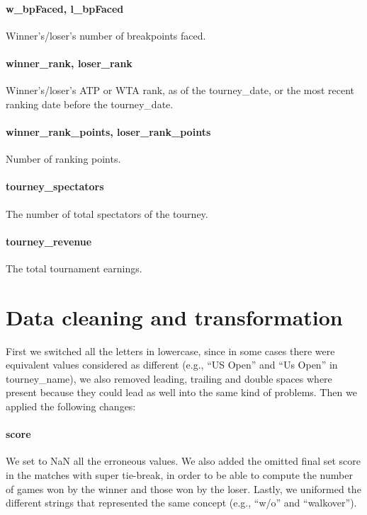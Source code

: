 \documentclass{article}
\begin{document}
\paragraph{w\_bpFaced, l\_bpFaced}
Winner's/loser's number of breakpoints faced.

\paragraph{winner\_rank, loser\_rank}
Winner's/loser's ATP or WTA rank, as of the tourney\_date, or the most recent ranking date before the tourney\_date.

\paragraph{winner\_rank\_points, loser\_rank\_points}
Number of ranking points.

\paragraph{tourney\_spectators}
The number of total spectators of the tourney.

\paragraph{tourney\_revenue}
The total tournament earnings.

\section{Data cleaning and transformation}

First we switched all the letters in lowercase, since in some cases there were equivalent values considered as different (e.g., “US Open” and “Us Open” in tourney\_name), we also removed leading, trailing and double spaces where present because they could lead as well into the same kind of problems. Then we applied the following changes:

\paragraph{score}
We set to NaN all the erroneous values. We also added the omitted final set score in the matches with super tie-break, in order to be able to compute the number of games won by the winner and those won by the loser. Lastly, we uniformed the different strings that represented the same concept (e.g., “w/o” and “walkover”).
\end{document}
